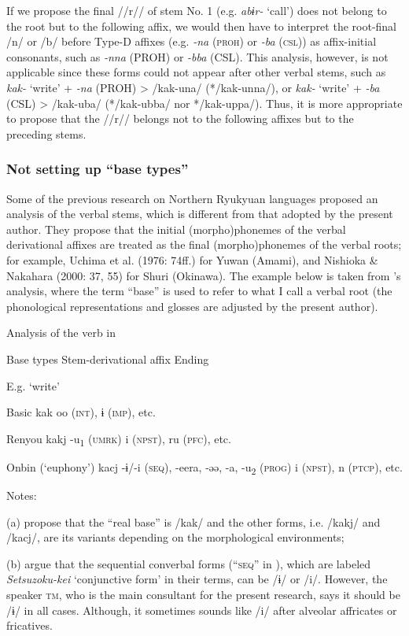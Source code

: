If we propose the final //r// of stem No. 1 (e.g. \textit{abɨr-} ‘call’) does not belong to the root but to the following affix, we would then have to interpret the root-final /n/ or /b/ before Type-D affixes (e.g. \textit{{}-na} (\textsc{proh}) or \textit{{}-ba} (\textsc{csl})) as affix-initial consonants, such as \textit{{}-nna} (PROH) or \textit{{}-bba} (CSL). This analysis, however, is not applicable since these forms could not appear after other verbal stems, such as \textit{kak-} ‘write’ + \textit{{}-na} (PROH) > /kak-una/ (*/kak-unna/), or \textit{kak-} ‘write’ + \textit{{}-ba} (CSL) > /kak-uba/ (*/kak-ubba/ nor */kak-uppa/). Thus, it is more appropriate to propose that the //r// belongs not to the following affixes but to the preceding stems.

\subsubsection{Not setting up “base types”}

Some of the previous research on Northern Ryukyuan languages proposed an analysis of the verbal stems, which is different from that adopted by the present author. They propose that the initial (morpho)phonemes of the verbal derivational affixes are treated as the final (morpho)phonemes of the verbal roots; for example, Uchima et al. (1976: 74ff.) for Yuwan (Amami), and Nishioka \& Nakahara (2000: 37, 55) for Shuri (Okinawa). The example below is taken from \citet{UchimaEtAl1976}’s analysis, where the term “base” is used to refer to what I call a verbal root (the phonological representations and glosses are adjusted by the present author).

\begin{table}
\caption{\label{tab:key:68}Analysis of the verb in \citet{UchimaEtAl1976}}

Base types    Stem-derivational affix  Ending

  E.g. ‘write’

Basic  kak    oo (\textsc{int}), ɨ (\textsc{imp}), etc.

Renyou  kakj  {}-u\textsubscript{1} (\textsc{umrk})  i (\textsc{npst}), ru (\textsc{pfc}), etc.

Onbin (‘euphony’)  kacj  {}-ɨ/-i (\textsc{seq}), -eera, -əə, -a, -u\textsubscript{2} (\textsc{prog})  i (\textsc{npst}), n (\textsc{ptcp}), etc.

Notes:

(a) \citet[78]{UchimaEtAl1976} propose that the “real base” is /kak/ and the other forms, i.e. /kakj/ and /kacj/, are its variants depending on the morphological environments;

(b) \citet[91-92]{UchimaEtAl1976} argue that the sequential converbal forms (“\textsc{seq}” in ), which are labeled \textit{Setsuzoku-kei} ‘conjunctive form’ in their terms, can be /ɨ/ or /i/. However, the speaker \textsc{tm}, who is the main consultant for the present research, says it should be /ɨ/ in all cases. Although, it sometimes sounds like /i/ after alveolar affricates or fricatives.
\end{table}

